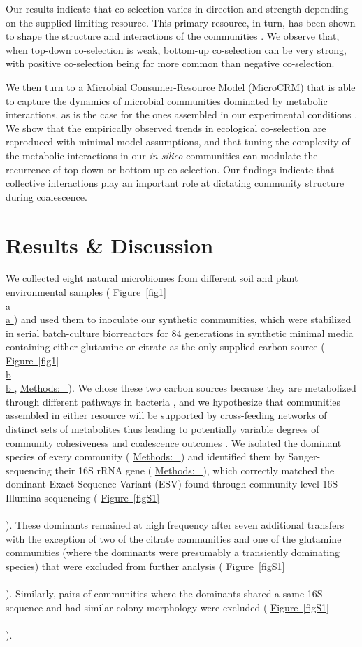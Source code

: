\documentclass[a4paper,10pt]{article}
\newcommand{\figref}[2][]{%
  \hyperref[{#2}]{%
    Figure~\ref*{#2}%
    \ifx\\#1\\%
    \else
      #1%
    \fi
  }%
}
\newcommand{\methodsref}[1]{%
  \hyperref[{methods:#1}]{%
   Methods:~\nameref*{methods:#1}%
  }%
}
\begin{document}
Our results indicate that co-selection varies in direction and strength depending on the supplied limiting
resource.
This primary resource, in turn, has been shown to
shape the structure and interactions of the communities \cite{Estrela2020}.
We observe that, when top-down co-selection is weak, bottom-up co-selection can be very strong,
with positive co-selection being far more common than negative co-selection.

We then turn to a Microbial Consumer-Resource Model (MicroCRM)
\cite{Goldford2018,Marsland2019,Marsland2020}
that is able to capture the dynamics of microbial communities dominated by metabolic interactions,
as is the case for the ones assembled in our experimental conditions \cite{Goldford2018,Estrela2020}.
We show that the empirically observed trends in ecological co-selection are reproduced
with minimal model assumptions, and that
tuning the complexity of the metabolic interactions in our \textit{in silico} communities can modulate
the recurrence of top-down or bottom-up co-selection.
Our findings indicate that collective interactions play an important role at dictating community structure
during coalescence.

\section*{Results \& Discussion}\label{results-discussion}

We collected eight natural microbiomes from different soil and plant environmental samples
(\figref[a]{fig1})
and used them to inoculate our synthetic communities, which were stabilized 
in serial batch-culture biorreactors for 84 generations in synthetic minimal media containing either
glutamine or citrate as the only supplied carbon source
(\figref[b]{fig1}, \methodsref{community-assembly}).
We chose these two carbon sources because they are metabolized through different
pathways in bacteria \cite{Dimroth2004,Forchhammer2007},
and we hypothesize that communities assembled in either resource will be supported by
cross-feeding networks of distinct sets of metabolites \cite{Goldford2018,Estrela2020}
thus leading to potentially variable degrees of community cohesiveness
and coalescence outcomes \cite{Tikhonov2016,Tikhonov2017,Castledine2020,Lechon2021}.
We isolated the dominant species of every community
(\methodsref{dominants})
and identified them by Sanger-sequencing their 16S rRNA gene
(\methodsref{sequencing}), which correctly matched the dominant
Exact Sequence Variant (ESV) \cite{Callahan2016,Callahan2017} found through
community-level 16S Illumina sequencing
(\figref{figS1}).
These dominants remained at high frequency after seven additional transfers
with the exception of two of the citrate communities and one of the glutamine
communities (where the dominants were presumably a transiently dominating species)
that were excluded from further analysis
(\figref{figS1}).
Similarly, pairs of communities where the dominants shared a same 16S sequence
and had similar colony morphology were excluded
(\figref{figS1}).
\end{document}
